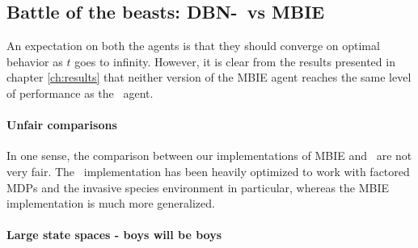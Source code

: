 \subsection{Battle of the beasts: DBN-\etre\ vs MBIE }

An expectation on both the agents is that they should converge on optimal behavior as $t$ goes to infinity. However, it is clear from the results presented in chapter \ref{ch:results} that neither version of the MBIE agent reaches the same level of performance as the \etre\ agent. 

\paragraph{Unfair comparisons} In one sense, the comparison between our implementations of MBIE and \etre\ are not very fair. The \etre\ implementation has been heavily optimized to work with factored MDPs and the invasive species environment in particular, whereas the MBIE implementation is much more generalized. \parencite{strehl2004empirical}  

\paragraph{Large state spaces - boys will be boys}


